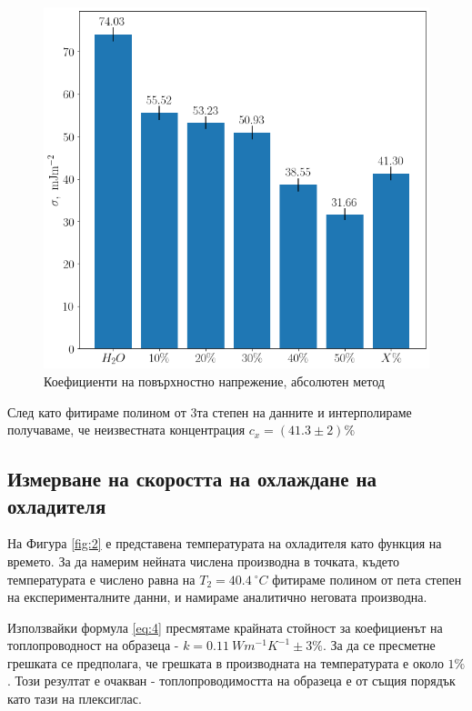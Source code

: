 \documentclass[reprint,amsmath,amssymb,aps,floatfix]{revtex4-2}
\newcommand{\degree}{^{\circ}}
\begin{document}
\begin{figure}[H] \label{fig:1} 
    \centering
    \includegraphics[width=0.9\columnwidth, keepaspectratio=true]{absolute.png}
    \caption{Коефициенти на повърхностно напрежение, абсолютен метод}
\end{figure}

След като фитираме полином от 3та степен на данните и интерполираме получаваме, че неизвестната концентрация $c_x = (41.3 \pm 2)\%$
\subsection{Измерване на скоростта на охлаждане на охладителя}

На Фигура \ref{fig:2} е представена температурата на охладителя като функция на времето. За да намерим нейната числена производна в точката, където температурата е числено равна на $T_2 = 40.4 \ \degree C$ фитираме полином от пета степен на експерименталните данни, и намираме аналитично неговата производна.  


Използвайки формула \eqref{eq:4} пресмятаме крайната стойност за коефициенът на топлопроводност на образеца - $k = 0.11 \ \si{Wm^{-1}K^{-1}} \pm 3\%$.  За да се пресметне грешката се предполага, че грешката в производната на температурата е около $1\%$. Този резултат е очакван - топлопроводимостта на образеца е от същия порядък като тази на плексиглас. 
\end{document}
